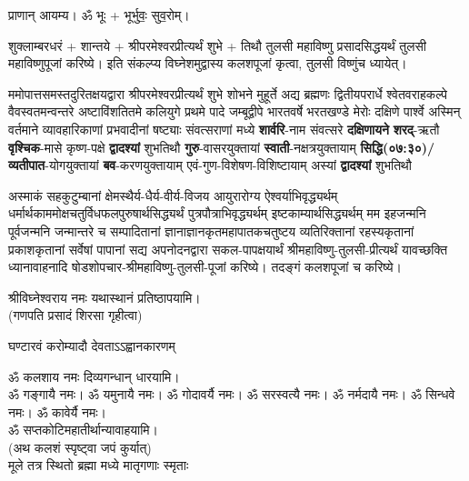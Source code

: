 प्राणान्  आयम्य।  ॐ भूः + भूर्भुवः॒ सुव॒रोम्।


शुक्लाम्बरधरं + शान्तये + श्रीपरमेश्वरप्रीत्यर्थं शुभे + तिथौ तुलसी महाविष्णु प्रसादसिद्धयर्थं तुलसी महाविष्णुपूजां करिष्ये।
इति संकल्प्य विघ्नेशमुद्वास्य कलशपूजां कृत्वा, तुलसी विष्णुंच ध्यायेत्। 



ममोपात्तसमस्तदुरितक्षयद्वारा श्रीपरमेश्वर\-प्रीत्यर्थं शुभे शोभने मुहूर्ते अद्य ब्रह्मणः
द्वितीयपरार्धे श्वेतवराहकल्पे वैवस्वतमन्वन्तरे अष्टाविंशतितमे कलियुगे प्रथमे पादे
जम्बूद्वीपे भारतवर्षे भरत\-खण्डे मेरोः दक्षिणे पार्श्वे अस्मिन् वर्तमाने व्यावहारिकाणां
प्रभवादीनां षष्ट्याः संवत्सराणां मध्ये \textbf{शार्वरि}-नाम संवत्सरे \textbf{दक्षिणायने} 
\textbf{शरद्}-ऋतौ  \textbf{वृश्चिक}-मासे कृष्ण-पक्षे \textbf{द्वादश्यां} शुभतिथौ
\textbf{गुरु}-वासरयुक्तायां 
\textbf{स्वाती}-नक्षत्र\-युक्तायाम्
\textbf{सिद्धि(\RIGHTarrow ०७:३०)/ व्यतीपात}-योग\-युक्तायां
\textbf{बव}-करण\-युक्तायाम् एवं-गुण-विशेषण-विशिष्टायाम् अस्यां \textbf{द्वादश्यां} शुभतिथौ 

अस्माकं सहकुटुम्बानां क्षेमस्थैर्य-धैर्य-वीर्य-विजय आयुरारोग्य ऐश्वर्याभिवृद्ध्यर्थम्
धर्मार्थकाममोक्ष\-चतुर्विधफलपुरुषार्थसिद्ध्यर्थं पुत्रपौत्राभि\-वृद्ध्यर्थम् इष्टकाम्यार्थसिद्ध्यर्थम्
मम इहजन्मनि पूर्वजन्मनि जन्मान्तरे च सम्पादितानां ज्ञानाज्ञानकृतमहा\-पातकचतुष्टय
व्यतिरिक्तानां रहस्यकृतानां प्रकाशकृतानां सर्वेषां पापानां सद्य अपनोदनद्वारा सकल-पापक्षयार्थं श्रीमहाविष्णु-तुलसी-प्रीत्यर्थं यावच्छक्ति ध्यानावाहनादि षोडशोपचार-श्रीमहाविष्णु-तुलसी-पूजां करिष्ये। तदङ्गं कलशपूजां च करिष्ये।


श्रीविघ्नेश्वराय नमः यथास्थानं प्रतिष्ठापयामि।\\
(गणपति प्रसादं शिरसा गृहीत्वा)



{घण्टारवं करोम्यादौ देवताऽऽह्वानकारणम्}

ॐ कलशाय नमः दिव्यगन्धान् धारयामि।\\
ॐ गङ्गायै नमः। ॐ यमुनायै नमः। ॐ गोदावर्यै नमः।  ॐ सरस्वत्यै नमः। ॐ नर्मदायै नमः। ॐ सिन्धवे नमः। ॐ कावेर्यै नमः।\\
ॐ सप्तकोटिमहातीर्थान्यावाहयामि। \\

(अथ कलशं स्पृष्ट्वा जपं कुर्यात्) \\

{मूले तत्र स्थितो ब्रह्मा मध्ये मातृगणाः स्मृताः}

